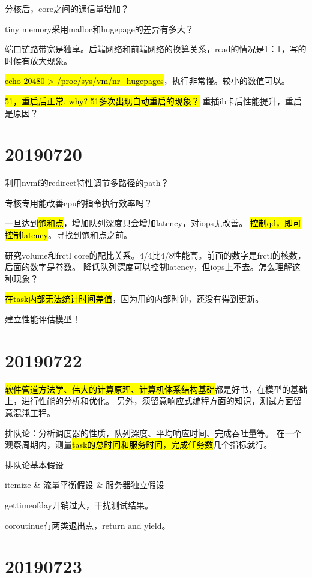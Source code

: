 分核后，core之间的通信量增加？

tiny memory采用malloc和hugepage的差异有多大？

\hrulefill

端口链路带宽是独享。后端网络和前端网络的换算关系，read的情况是1：1，写的时候有放大现象。

\hl{echo 20480 > /proc/sys/vm/nr\_hugepages}，执行非常慢。较小的数值可以。

\hl{51，重启后正常, why? 51多次出现自动重启的现象？} 重插ib卡后性能提升，重启是原因？

\section{20190720}

利用nvmf的redirect特性调节多路径的path？

专核专用能改善cpu的指令执行效率吗？

一旦达到\hl{饱和点}，增加队列深度只会增加latency，对iops无改善。
\hl{控制qd，即可控制latency}。寻找到饱和点之前。

研究volume和frctl core的配比关系。4/4比4/8性能高。前面的数字是frctl的核数，后面的数字是卷数。
降低队列深度可以控制latency，但iops上不去。怎么理解这种现象？

\hl{在task内部无法统计时间差值}，因为用的内部时钟，还没有得到更新。

建立性能评估模型！

\section{20190722}

\hl{软件管道方法学、伟大的计算原理、计算机体系结构基础}都是好书，在模型的基础上，进行性能的分析和优化。
另外，须留意响应式编程方面的知识，测试方面留意混沌工程。

排队论：分析调度器的性质，队列深度、平均响应时间、完成吞吐量等。
在一个观察周期内，测量\hl{task的总时间和服务时间，完成任务数}几个指标就行。

排队论基本假设
\begin{myeasylist}{itemize}
& 流量平衡假设
& 服务器独立假设
\end{myeasylist}

gettimeofday开销过大，干扰测试结果。

coroutinue有两类退出点，return and yield。

\section{20190723}

